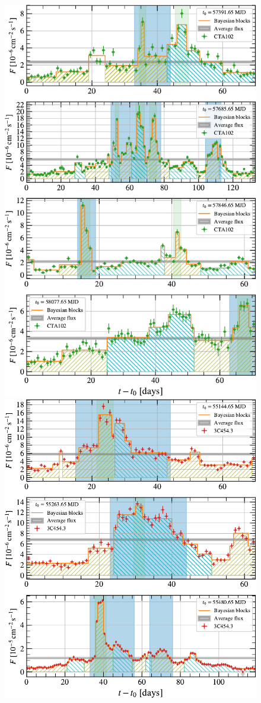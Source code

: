 \documentclass[twocolumn]{aastex62}
\begin{document}
\begin{figure}
    \includegraphics[width = .45\linewidth]{figures/lc_CTA102_daily.pdf}
    \includegraphics[width = .45\linewidth]{figures/lc_3C454p3_daily.pdf}
    \caption{\label{fig:daily-cta102-3c454}}
\end{figure}
\end{document}
